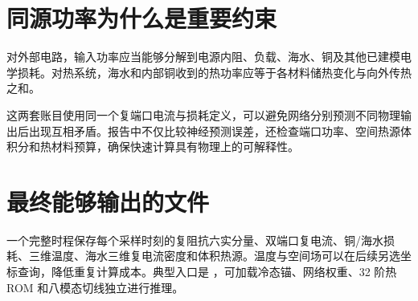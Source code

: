 \section{同源功率为什么是重要约束}
对外部电路，输入功率应当能够分解到电源内阻、负载、海水、铜及其他已建模电学损耗。对热系统，海水和内部铜收到的热功率应等于各材料储热变化与向外传热之和。

这两套账目使用同一个复端口电流与损耗定义，可以避免网络分别预测不同物理输出后出现互相矛盾。报告中不仅比较神经预测误差，还检查端口功率、空间热源体积分和热材料预算，确保快速计算具有物理上的可解释性。

\section{最终能够输出的文件}
一个完整时程保存每个采样时刻的复阻抗六实分量、双端口复电流、铜/海水损耗、三维温度、海水三维复电流密度和体积热源。温度与空间场可以在后续另选坐标查询，降低重复计算成本。典型入口是 ，可加载冷态锚、网络权重、32 阶热 ROM 和八模态切线独立进行推理。
